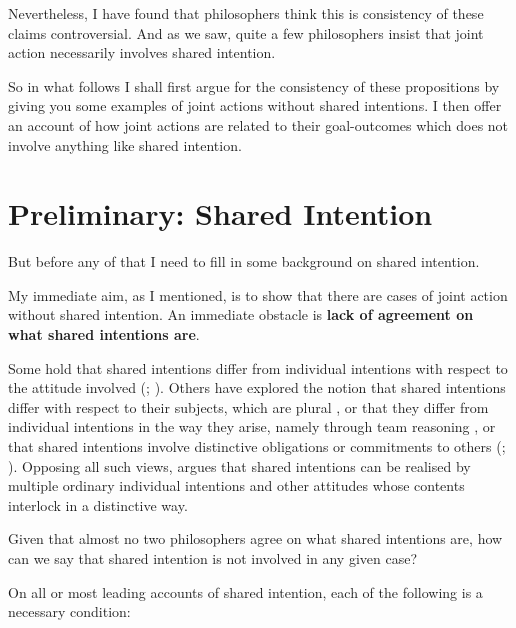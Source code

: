 \documentclass[12pt,a4paper]{extarticle}
\begin{document}
Nevertheless, I have found that philosophers think this is consistency of these claims controversial.  And as we saw, quite a few philosophers insist that joint action necessarily involves shared intention.  

So in what follows I shall first argue for the consistency of these propositions by giving you some examples of joint actions without shared intentions.  I then offer an account of how joint actions are related to their goal-outcomes which does not involve anything like shared intention.  


\section{Preliminary: Shared Intention}

But before any of that I need to fill in some background on shared intention.

My immediate aim, as I mentioned, is to show that there are cases of joint action without shared intention.  An immediate obstacle is \textbf{lack of agreement on what shared intentions are}.  

Some hold that shared intentions differ from individual intentions with respect to the attitude involved (\citealp{Kutz:2000si}; \citealp{Searle:1990em}). 
Others have explored the notion that shared intentions differ with respect to their subjects, which are plural \citep{Gilbert:1992rs}, 
or that they differ from individual intentions in the way they arise, namely through team reasoning \citep{Gold:2007zd}, 
or that shared intentions involve distinctive obligations or commitments to others (\citealp{Gilbert:1992rs}; \citealp{Roth:2004ki}).
Opposing all such views, \citet{Bratman:1992mi,Bratman:2009lv} argues that shared intentions can be realised by multiple ordinary individual intentions and other attitudes whose contents interlock in a distinctive way. 

Given that almost no two philosophers agree on what shared intentions are, how can we say that shared intention is not involved in any given case?  

On all or most leading accounts of shared intention, each of the following is a necessary condition:
\end{document}
